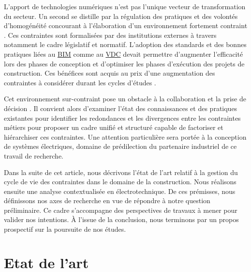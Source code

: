 \documentclass[a4paper,12pt]{article}
\begin{document}
L’apport de technologies numériques n’est pas l’unique vecteur de transformation du secteur. Un second se distille par la régulation des pratiques et des volontés d'homogénéité concourant à l’élaboration d’un environnement fortement contraint \autocite{benzerafa-alilatLinflationNormativeLamplification2022a}. Ces contraintes sont formalisées par des institutions externes \autocite{artokiviniemiPREMISSRequirementsManagement2004} à travers notamment le cadre législatif et normatif. L’adoption des standards et des bonnes pratiques liées au \protect\hyperlink{gls-1}{\label{gls-1-use-9}BIM} comme au \protect\hyperlink{gls-3}{\label{gls-3-use-5}VDC} devait permettre d’augmenter l’efficacité lors des phases de conception et d’optimiser les phases d’exécution des projets de construction. Ces bénéfices sont acquis au prix d’une augmentation des contraintes à considérer durant les cycles d’études \autocite{shahruddinBIMRequirementsConstruction2020a}. 

Cet environnement sur-contraint pose un obstacle à la collaboration et la prise de décision \autocite{adriennecostaConstructionNormeLarchitecte2012}. Il convient alors d'examiner l'état des connaissances et des pratiques existantes pour identifier les redondances et les divergences entre  les contraintes métiers pour proposer un cadre unifié et structuré capable de factoriser et hiérarchiser ces contraintes. Une attention particulière sera portée à la conception de systèmes électriques, domaine de prédilection du partenaire industriel de ce travail de recherche.

Dans la suite de cet article, nous décrivons l’état de l’art relatif à la gestion du cycle de vie des contraintes dans le domaine de la construction. Nous réalisons ensuite une analyse contextualisée en électrotechnique. De ces prémisses, nous définissons nos axes de recherche en vue de répondre à notre question préliminaire. Ce cadre s’accompagne des perspectives de travaux à mener pour valider nos intentions. À l'issue de la conclusion, nous terminons par un propos prospectif sur la poursuite de nos études.
\section{Etat de l’art}
\label{sec:org91d9d7b}
\end{document}
